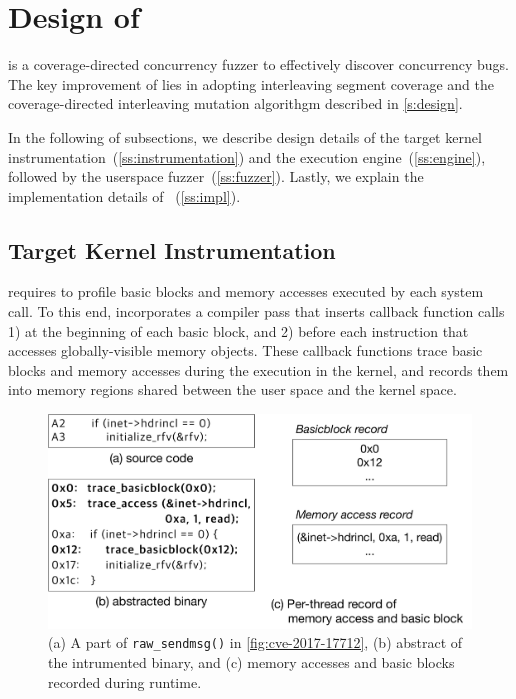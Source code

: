 \section{Design of \sys}
\label{s:impl}

\sys is a coverage-directed concurrency fuzzer to effectively discover
concurrency bugs.
%
The key improvement of \sys lies in adopting interleaving segment
coverage and the coverage-directed interleaving \dr{}mutation
algorithgm described in \autoref{s:design}.
%





In the following of subsections, we describe design details of the
target kernel instrumentation~(\autoref{ss:instrumentation}) and the
execution engine~(\autoref{ss:engine}), followed by the userspace
fuzzer~(\autoref{ss:fuzzer}).  Lastly, we explain the implementation
details of \sys~(\autoref{ss:impl}).


\subsection{Target Kernel Instrumentation}
\label{ss:instrumentation}

\sys requires to profile basic blocks and memory accesses executed by
each system call.
%
To this end, \sys incorporates a compiler pass that inserts callback
function calls 1) at the beginning of each basic block, and 2) before
each instruction that accesses globally-visible memory objects.
%
These callback functions trace basic blocks and memory accesses during
the execution in the kernel, and records them into memory regions
shared between the user space and the kernel space.



\begin{figure}
  \centering
  \includegraphics[width=\linewidth]{fig/instrumentation.pdf}
  \caption{(a) A part of \texttt{raw_sendmsg()} in
    \autoref{fig:cve-2017-17712}, (b) abstract of the intrumented
    binary, and (c) memory accesses and basic blocks recorded during
    runtime.}
  \label{fig:instrumentation}
\end{figure}

